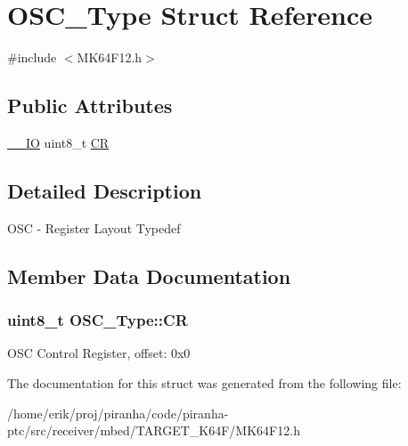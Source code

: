 \hypertarget{structOSC__Type}{}\section{O\+S\+C\+\_\+\+Type Struct Reference}
\label{structOSC__Type}


{\ttfamily \#include $<$M\+K64\+F12.\+h$>$}

\subsection*{Public Attributes}
\begin{DoxyCompactItemize}
\item 
\hyperlink{core__sc300_8h_aec43007d9998a0a0e01faede4133d6be}{\+\_\+\+\_\+\+IO} uint8\+\_\+t \hyperlink{structOSC__Type_afb099b77ea7a74fe342d9bf1335b86a6}{CR}
\end{DoxyCompactItemize}


\subsection{Detailed Description}
O\+SC -\/ Register Layout Typedef 

\subsection{Member Data Documentation}
\subsubsection[{\texorpdfstring{CR}{CR}}]{ uint8\+\_\+t O\+S\+C\+\_\+\+Type\+::\+CR}\hypertarget{structOSC__Type_afb099b77ea7a74fe342d9bf1335b86a6}{}\label{structOSC__Type_afb099b77ea7a74fe342d9bf1335b86a6}
O\+SC Control Register, offset\+: 0x0 

The documentation for this struct was generated from the following file\+:\begin{DoxyCompactItemize}
\item 
/home/erik/proj/piranha/code/piranha-\/ptc/src/receiver/mbed/\+T\+A\+R\+G\+E\+T\+\_\+\+K64\+F/M\+K64\+F12.\+h\end{DoxyCompactItemize}
